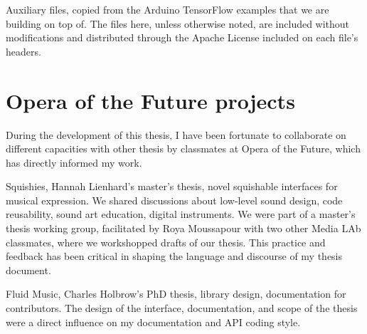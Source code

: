 Auxiliary files, copied from the Arduino TensorFlow examples that we are building on top of. The files here, unless otherwise noted, are included without modifications and distributed through the Apache License included on each file's headers.

\section{Opera of the Future projects}

During the development of this thesis, I have been fortunate to collaborate on different capacities with other thesis by classmates at Opera of the Future, which has directly informed my work.

Squishies, Hannah Lienhard's master's thesis, novel squishable interfaces for musical expression. We shared discussions about low-level sound design, code reusability, sound art education, digital instruments. We were part of a master's thesis working group, facilitated by Roya Moussapour with two other Media LAb classmates, where we workshopped drafts of our thesis. This practice and feedback has been critical in shaping the language and discourse of my thesis document.

Fluid Music, Charles Holbrow's PhD thesis, library design, documentation for contributors. The design of the interface, documentation, and scope of the thesis were a direct influence on my documentation and API coding style.
